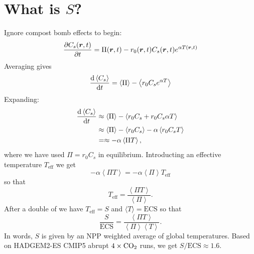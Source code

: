 

\section{What is $S$?}
Ignore compost bomb effects to begin:
\begin{equation}
  \label{eq:spatially_resolved_soil_carbon}
  \pdv{ C_s (\bm{r},t)}{t} = \Pi(\bm{r},t) - r_0(\bm{r},t)C_s(\bm{r},t)e^{\alpha T(\bm{r},t)}
\end{equation}
Averaging gives
\begin{equation}
  \label{eq:spatially_averaged_soil_carbon}
  \dv{\left\langle C_s\right\rangle}{t} = \left\langle \Pi \right \rangle - \left\langle r_0 C_s e^{\alpha T} \right \rangle
\end{equation}
Expanding:
\begin{align*}
  \dv{\left\langle C_s\right\rangle}{t} &\approx \left\langle \Pi \right \rangle - \left\langle r_0 C_s + r_0 C_s \alpha T \right \rangle \\
                                        &\approx \left\langle \Pi \right \rangle - \left\langle r_0 C_s\right \rangle - \alpha \left \langle r_0C_s T\right\rangle \\
                                        &=\approx - \alpha \left \langle \Pi T\right\rangle,
\end{align*}
where we have used $\Pi = r_0C_s$ in equilibrium. Introducting an effective temperature $T_{\mathrm{eff}}$ we get
\begin{equation*}
  - \alpha \left \langle \Pi T \right\rangle = - \alpha \left \langle \Pi \right\rangle T_{\mathrm{eff}}
\end{equation*}
so that
\begin{equation}
  \label{eq:definition_of_effective_temperature}
  T_{\mathrm{eff}} = \frac{\left \langle \Pi T \right\rangle}{\left \langle \Pi \right\rangle}.
\end{equation}
After a double of  we have $T_{\mathrm{eff}} = S$ and $\langle T \rangle = \mathrm{ECS}$ so that
\begin{equation}
  \label{eq:S_vs_ECS}
  \frac{S}{\mathrm{ECS}} = \frac{\left \langle \Pi T \right\rangle}{\left \langle \Pi \right\rangle \left \langle T \right \rangle}.
\end{equation}
In words, $S$ is given by an NPP weighted average of global temperatures.
Based on HADGEM2-ES CMIP5 abrupt $4\times\ce{CO2}$ runs, we get $S/\mathrm{ECS} \approx 1.6$.
